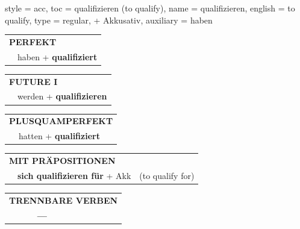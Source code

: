\begin{verbentry}{
  style = {acc},
  toc = {qualifizieren (to qualify)},
  name = {qualifizieren},
  english = {to qualify},
  type = {regular, + Akkusativ},
  auxiliary = {haben}
}
\begin{tabular}{rl}
\multicolumn{2}{l}{\textbf{PERFEKT}}\\
& haben + \textbf{qualifiziert}\\
\end{tabular}
\hfill
\begin{tabular}{rl}
\multicolumn{2}{l}{\textbf{FUTURE I}}\\
& werden + \textbf{qualifizieren}\\
\end{tabular}
\hfill
\begin{tabular}{rl}
\multicolumn{2}{l}{\textbf{PLUSQUAMPERFEKT}}\\
& hatten + \textbf{qualifiziert}\\
\end{tabular}

\vspace{10pt}

\begin{tabular}{lll}
\multicolumn{3}{l}{\textbf{MIT PRÄPOSITIONEN}}\\
& \textbf{sich qualifizieren für} + Akk & (to qualify for)\\
\end{tabular}
\hfill
\begin{tabular}{lll}
\multicolumn{3}{l}{\textbf{TRENNBARE VERBEN}}\\
& \textbf{---} & \\
\end{tabular}

\vspace{-5pt}
\end{verbentry}
